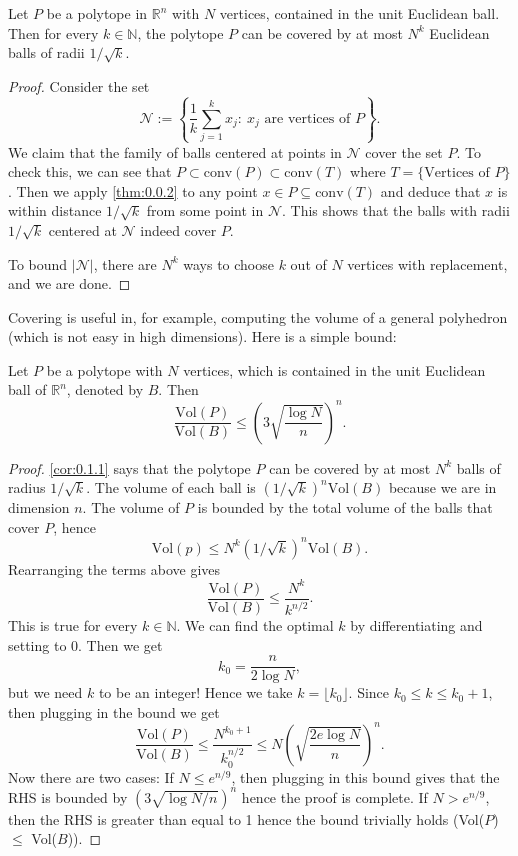 \begin{corollary}
\label{cor:0.1.1}
Let $P$ be a polytope in $\mathbb{R}^n$ with $N$ vertices, contained in the unit Euclidean ball. Then 
for every $k \in \mathbb{N}$, the polytope $P$ can be covered by at most $N^k$ Euclidean balls of radii $
1 / \sqrt{k}$.
\end{corollary}

\begin{proof}
Consider the set 
\[ \mathcal{N} := \left\{ \frac{1}{k}\sum_{j = 1}^{k} x_j: \ x_j 
\text{ are vertices of } P \right\}. \]
We claim that the family of balls centered at points in $\mathcal{N}$ cover the set $P$. To check this, we 
can see that $P \subset \text{conv}(P) \subset \text{conv}(T)$ where $T = \{\text{Vertices of } P\}$. 
Then we apply \cref{thm:0.0.2} to any point $x \in P \subseteq \text{conv}(T)$ and deduce that $x$ is within 
distance $1/\sqrt{k}$ from some point in $\mathcal{N}$. This shows that the balls with radii $1/\sqrt{k}$ 
centered at $\mathcal{N}$ indeed cover $P$. 

To bound $|\mathcal{N}|$, there are $N^k$ ways to choose $k$ out of $N$ vertices with replacement, and 
we are done.	
\end{proof}

Covering is useful in, for example, computing the volume of a general polyhedron (which is not easy in 
high dimensions). Here is a simple bound: 
\begin{theorem}[]
\label{thm:0.1.2}
Let $P$ be a polytope with $N$ vertices, which is contained in the unit Euclidean ball of $\mathbb{R}^n$, 
denoted by $B$. Then 
\[ \frac{\text{Vol}(P)}{\text{Vol}(B)} \leq \left( 3 \sqrt{\frac{\log{N}}{n}} \right)^n. \]
\end{theorem}

\begin{proof}
\cref{cor:0.1.1} says that the polytope $P$ can be covered by at most $N^k$ balls of radius $1/\sqrt{k}$. 
The volume of each ball is $(1/\sqrt{k})^{n} \text{Vol}(B)$ because we are in dimension $n$. The volume of 
$P$ is bounded by the total volume of the balls that cover $P$, hence 
\[ \text{Vol}(p) \leq N^k (1 / \sqrt{k})^n \text{Vol}(B). \]
Rearranging the terms above gives 
\[ \frac{\text{Vol}(P)}{\text{Vol}(B)} \leq \frac{N^k}{k^{n/2}}. \]
This is true for every $k \in \mathbb{N}$. We can find the optimal $k$ by differentiating and setting 
to 0. Then we get 
\[ k_0 = \frac{n}{2 \log{N}}, \]
but we need $k$ to be an integer! Hence we take $k = \lfloor k_0 \rfloor$. Since $k_0 \leq k \leq k_0 + 1$, 
then plugging in the bound we get 
\[ \frac{\text{Vol}(P)}{\text{Vol}(B)} \leq \frac{N^{k_0 + 1}}{k_0^{n / 2}} 
\leq N \left( \sqrt{\frac{2e \log{N}}{n}} \right)^n. \]
Now there are two cases: If $N \leq e^{n / 9}$, then plugging in this bound gives that the RHS is bounded 
by $(3 \sqrt{\log{N} / n})^n$ hence the proof is complete. If $N > e^{n / 9}$, then the RHS is greater than 
equal to 1 hence the bound trivially holds (Vol($P$) $\leq$ Vol($B$)).
\end{proof}

